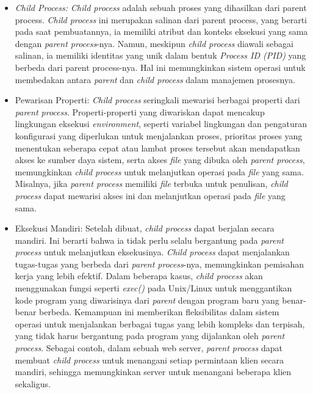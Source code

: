\documentclass[12pt]{article}
\begin{document}
\begin{itemize}
    
    \item \textit{{Child Process:} Child process} adalah sebuah proses yang dihasilkan dari parent process. \textit{Child process} ini merupakan salinan dari parent process, yang berarti pada saat pembuatannya, ia memiliki atribut dan konteks eksekusi yang sama dengan \textit{parent process}-nya. Namun, meskipun \textit{child process} diawali sebagai salinan, ia memiliki identitas yang unik dalam bentuk \textit{Process ID (PID)} yang berbeda dari parent process-nya. Hal ini memungkinkan sistem operasi untuk membedakan antara \textit{parent} dan \textit{child process} dalam manajemen prosesnya.
    
    \item {Pewarisan Properti:} \textit{Child process} seringkali mewarisi berbagai properti dari \textit{parent process}. Properti-properti yang diwariskan dapat mencakup lingkungan eksekusi \textit{environment}, seperti variabel lingkungan dan pengaturan konfigurasi yang diperlukan untuk menjalankan proses, prioritas proses yang menentukan seberapa cepat atau lambat proses tersebut akan mendapatkan akses ke sumber daya sistem, serta akses \textit{file} yang dibuka oleh \textit{parent process}, memungkinkan \textit{child process} untuk melanjutkan operasi pada \textit{file} yang sama. Misalnya, jika \textit{parent process} memiliki \textit{file} terbuka untuk penulisan, \textit{child process} dapat mewarisi akses ini dan melanjutkan operasi pada \textit{file} yang sama.

    
    \item {Eksekusi Mandiri:} Setelah dibuat, \textit{child process} dapat berjalan secara mandiri. Ini berarti bahwa ia tidak perlu selalu bergantung pada \textit{parent process} untuk melanjutkan eksekusinya. \textit{Child process} dapat menjalankan tugas-tugas yang berbeda dari \textit{parent process}-nya, memungkinkan pemisahan kerja yang lebih efektif. Dalam beberapa kasus, \textit{child process} akan menggunakan fungsi seperti \textit{exec()} pada Unix/Linux untuk menggantikan kode program yang diwarisinya dari \textit{parent} dengan program baru yang benar-benar berbeda. Kemampuan ini memberikan fleksibilitas dalam sistem operasi untuk menjalankan berbagai tugas yang lebih kompleks dan terpisah, yang tidak harus bergantung pada program yang dijalankan oleh \textit{parent process}. Sebagai contoh, dalam sebuah web server, \textit{parent process} dapat membuat \textit{child process} untuk menangani setiap permintaan klien secara mandiri, sehingga memungkinkan server untuk menangani beberapa klien sekaligus.
\end{itemize}
\end{document}
